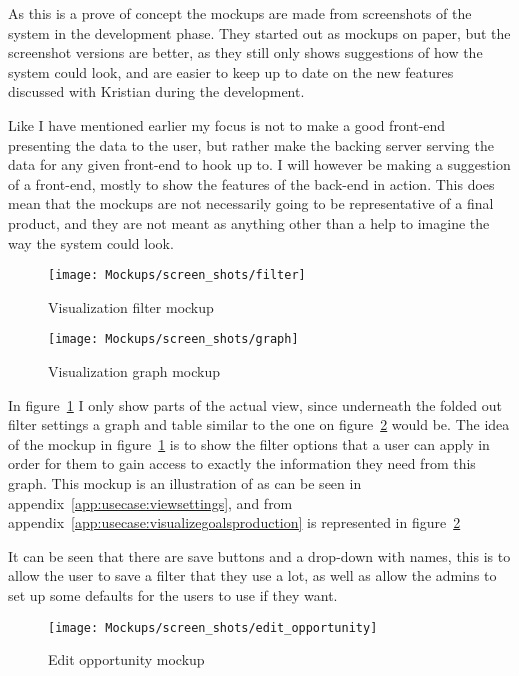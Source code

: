 As this is a prove of concept the mockups are made from screenshots of the
system in the development phase. They started out as mockups on paper, but the
screenshot versions are better, as they still only shows suggestions of how the
system could look, and are easier to keep up to date on the new features
discussed with Kristian during the development.

Like I have mentioned earlier my focus is not to make a good front-end presenting
the data to the user, but rather make the backing server serving the data for
any given front-end to hook up to. I will however be making a suggestion of a
front-end, mostly to show the features of the back-end in action. This does
mean that the mockups are not necessarily going to be representative of
a final product, and they are not meant as anything other than a help to
imagine the way the system could look. 

\begin{figure}[!htb]
  \centering
  \texttt{[image: Mockups/screen\_shots/filter]}
  \caption{Visualization filter mockup}
  \label{fig:VisualizationFilter}
\end{figure}

\begin{figure}[!htb]
  \centering
  \texttt{[image: Mockups/screen\_shots/graph]}
  \caption{Visualization graph mockup}
  \label{fig:VisualizationView}
\end{figure}

In figure~\ref{fig:VisualizationFilter} I only show parts  of the actual view,
since underneath the folded out filter settings a graph and table similar to the
one on figure~\ref{fig:VisualizationView} would be. The idea of the mockup in
figure~\ref{fig:VisualizationFilter} is to show the filter options that a user
can apply in order for them to gain access to exactly the information they need
from this graph. This mockup is an illustration of
 as can be seen in
appendix~\ref{app:usecase:viewsettings}, and
 from
appendix~\ref{app:usecase:visualizegoalsproduction} is represented in figure~\ref{fig:VisualizationView}

It can be seen that there are save buttons and a drop-down with names, this is to
allow the user to save a filter that they use a lot, as well as allow the admins
to set up some defaults for the users to use if they want.

\begin{figure}[!htb]
  \centering
  \texttt{[image: Mockups/screen\_shots/edit\_opportunity]}
  \caption{Edit opportunity mockup}
  \label{fig:OpportunityView}
\end{figure}

